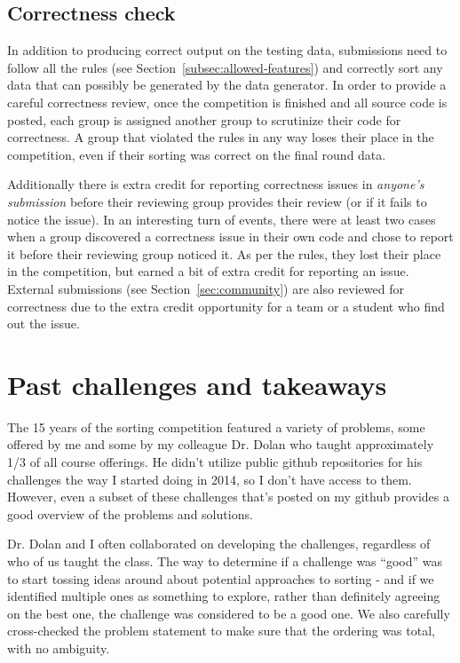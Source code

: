 \documentclass[12pt]{article}
\begin{document}
\subsection{Correctness check}\label{subsec:correct}
In addition to producing correct output on the testing data, submissions need to follow all the rules (see Section~\ref{subsec:allowed-features}) and correctly sort any data that can possibly be generated by the data generator. In order to provide a careful correctness review, once the competition is finished and all source code is posted, each group is assigned another group to scrutinize their code for correctness. 
A group that violated the rules in any way loses their place in the competition, even if their sorting was correct on the final round data. 

Additionally there is extra credit for reporting correctness issues in \textit{anyone's submission} before their reviewing group provides their review (or if it fails to notice the issue). 
In an interesting turn of events, there were at least two cases when a group discovered a correctness issue in their own code and chose to report it before their reviewing group noticed it. 
As per the rules, they lost their place in the competition, but earned a bit of extra credit for reporting an issue. 
External submissions (see Section~\ref{sec:community}) are also reviewed for correctness due to the extra credit opportunity for a team or a student who find out the issue. 

\section{Past challenges and takeaways}\label{sec:past}
The 15 years of the sorting competition featured a variety of problems, some offered by me and some by my colleague Dr. Dolan who taught approximately 1/3 of all course offerings. He didn't utilize public github repositories for his challenges the way I started doing in 2014, so I don't have access to them. However, even a subset of these challenges that's posted on my github provides a good overview of the problems and solutions. 

Dr. Dolan and I often collaborated on developing the challenges, regardless of who of us taught the class. The way to determine if a challenge was ``good'' was to start tossing ideas around about potential approaches to sorting - and if we identified multiple ones as something to explore, rather than definitely agreeing on the best one, the challenge was considered to be a good one. 
We also carefully cross-checked the problem statement to make sure that the ordering was total, with no ambiguity.  
\end{document}
